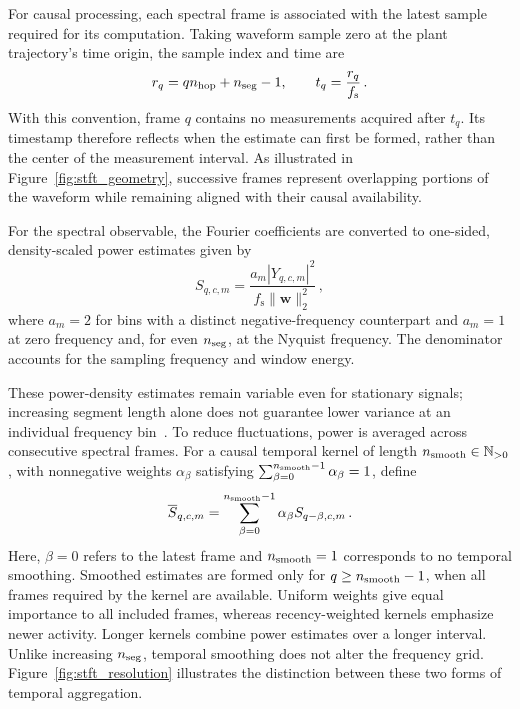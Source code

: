 For causal processing, each spectral frame is associated with the latest sample required for its computation.
Taking waveform sample zero at the plant trajectory's time origin, the sample index and time are
\begin{equation*}
    r_q=qn_{\mathrm{hop}}{}+n_{\mathrm{seg}}{}-1,
    \qquad
    t_q=\frac{r_q}{f_\mathrm{s}}\,.
\end{equation*}
With this convention, frame $q$ contains no measurements acquired after $t_q$.
Its timestamp therefore reflects when the estimate can first be formed, rather than the center of the measurement interval.
As illustrated in Figure~\ref{fig:stft_geometry}, successive frames represent overlapping portions of the waveform while remaining aligned with their causal availability.

For the spectral observable, the Fourier coefficients are converted to one-sided, density-scaled power estimates given by
\begin{equation*}
    S_{q,c,m}
    =
    \frac{a_m|Y_{q,c,m}|^2}
    {f_\mathrm{s}\|\mathbf{w}\|_2^2}\,,
\end{equation*}
where $a_m=2$ for bins with a distinct negative-frequency counterpart and $a_m=1$ at zero frequency and, for even $n_{\mathrm{seg}}{}$, at the Nyquist frequency.
The denominator accounts for the sampling frequency and window energy.

These power-density estimates remain variable even for stationary signals; increasing segment length alone does not guarantee lower variance at an individual frequency bin~\cite{Astfalck2024}.
To reduce fluctuations, power is averaged across consecutive spectral frames.
For a causal temporal kernel of length $n_{\mathrm{smooth}}{}\in\mathbb N_{>0}$, with nonnegative weights $\alpha_\beta$ satisfying $\sum_{\beta=0}^{n_{\mathrm{smooth}}{}-1}\alpha_\beta=1$, define
\begin{equation*}
    \overline{S}_{q,c,m}
    =
    \sum_{\beta=0}^{n_{\mathrm{smooth}}{}-1}
    \alpha_\beta S_{q-\beta,c,m}\,.
\end{equation*}
Here, $\beta=0$ refers to the latest frame and $n_{\mathrm{smooth}}{}=1$ corresponds to no temporal smoothing.
Smoothed estimates are formed only for $q\geq n_{\mathrm{smooth}}{}-1$, when all frames required by the kernel are available.
Uniform weights give equal importance to all included frames, whereas recency-weighted kernels emphasize newer activity.
Longer kernels combine power estimates over a longer interval.
Unlike increasing $n_{\mathrm{seg}}{}$, temporal smoothing does not alter the frequency grid.
Figure~\ref{fig:stft_resolution} illustrates the distinction between these two forms of temporal aggregation.

